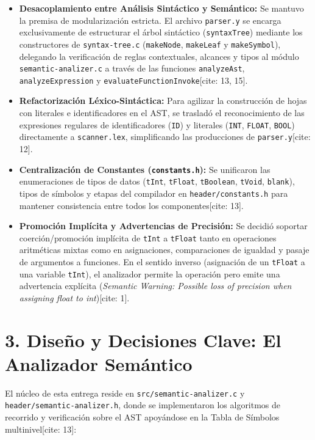 \documentclass[12pt, a4paper]{article}
\begin{document}
\begin{itemize}
    \item \textbf{Desacoplamiento entre Análisis Sintáctico y Semántico:} Se mantuvo la premisa de modularización estricta. El archivo \texttt{parser.y} se encarga exclusivamente de estructurar el árbol sintáctico (\texttt{syntaxTree}) mediante los constructores de \texttt{syntax-tree.c} (\texttt{makeNode}, \texttt{makeLeaf} y \texttt{makeSymbol}), delegando la verificación de reglas contextuales, alcances y tipos al módulo \texttt{semantic-analizer.c} a través de las funciones \texttt{analyzeAst}, \texttt{analyzeExpression} y \texttt{evaluateFunctionInvoke}[cite: 13, 15].
    \item \textbf{Refactorización Léxico-Sintáctica:} Para agilizar la construcción de hojas con literales e identificadores en el AST, se trasladó el reconocimiento de las expresiones regulares de identificadores (\texttt{ID}) y literales (\texttt{INT}, \texttt{FLOAT}, \texttt{BOOL}) directamente a \texttt{scanner.lex}, simplificando las producciones de \texttt{parser.y}[cite: 12].
    \item \textbf{Centralización de Constantes (\texttt{constants.h}):} Se unificaron las enumeraciones de tipos de datos (\texttt{tInt}, \texttt{tFloat}, \texttt{tBoolean}, \texttt{tVoid}, \texttt{blank}), tipos de símbolos y etapas del compilador en \texttt{header/constants.h} para mantener consistencia entre todos los componentes[cite: 13].
    \item \textbf{Promoción Implícita y Advertencias de Precisión:} Se decidió soportar coerción/promoción implícita de \texttt{tInt} a \texttt{tFloat} tanto en operaciones aritméticas mixtas como en asignaciones, comparaciones de igualdad y pasaje de argumentos a funciones. En el sentido inverso (asignación de un \texttt{tFloat} a una variable \texttt{tInt}), el analizador permite la operación pero emite una advertencia explícita (\textit{Semantic Warning: Possible loss of precision when assigning float to int})[cite: 1].
\end{itemize}

\section{3. Diseño y Decisiones Clave: El Analizador Semántico}
El núcleo de esta entrega reside en \texttt{src/semantic-analizer.c} y \texttt{header/semantic-analizer.h}, donde se implementaron los algoritmos de recorrido y verificación sobre el AST apoyándose en la Tabla de Símbolos multinivel[cite: 13]:
\end{document}
